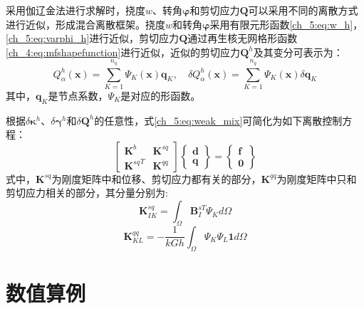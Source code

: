 采用伽辽金法进行求解时，挠度$w$、转角$\boldsymbol{\varphi}$和剪切应力$\boldsymbol{Q}$可以采用不同的离散方式进行近似，形成混合离散框架。挠度$w$和转角$\boldsymbol{\varphi}$采用有限元形函数\eqref{ch_5:eq:w_h}，\eqref{ch_5:eq:varphi_h}进行近似，剪切应力$\boldsymbol{Q}$通过再生核无网格形函数\eqref{ch_4:eq:mfshapefunction}进行近似，近似的剪切应力$\boldsymbol{Q}^h$及其变分可表示为：
\begin{equation}\label{ch_5:eq:Q_h}
    Q^h_\alpha(\boldsymbol x) = \sum_{K=1}^{n_q} \Psi_K(\boldsymbol x) \boldsymbol{q}_{K},\quad \delta Q^h_\alpha(\boldsymbol x) = \sum_{K=1}^{n_q} \Psi_K(\boldsymbol x) \delta \boldsymbol{q}_{ K}
\end{equation}
其中，$\boldsymbol{q}_{ K}$是节点系数，$\Psi_K$是对应的形函数。

根据$\delta\boldsymbol\kappa^h$、$\delta\boldsymbol\gamma^h$和$\delta\boldsymbol Q^h$的任意性，式\eqref{ch_5:eq:weak_mix}可简化为如下离散控制方程：
\begin{equation} \label{equilibrium_mindlin_mix}
    \begin{bmatrix}\boldsymbol{K}^{b}&\boldsymbol{K}^{sq}\\{\boldsymbol{K}^{sq}}^T&\boldsymbol{K}^{qq}\end{bmatrix}
    \begin{Bmatrix}\boldsymbol{d}\\\boldsymbol{q}\end{Bmatrix}=
    \begin{Bmatrix}\boldsymbol{f}\\\boldsymbol{0}\end{Bmatrix}
\end{equation}
式中，$\boldsymbol K^{sq}$为刚度矩阵中和位移、剪切应力都有关的部分，$\boldsymbol K^{qq}$为刚度矩阵中只和剪切应力相关的部分，其分量分别为:
\begin{equation} 
    \boldsymbol K^{sq}_{IK} = \int_\Omega \boldsymbol B^{sT}_I \Psi_K d\Omega
\end{equation} 
\begin{equation} 
    \boldsymbol K^{qq}_{KL} = -\frac{1}{kGh} \int_\Omega \Psi_K \Psi_L \boldsymbol 1 d\Omega
\end{equation}


\section{数值算例}
